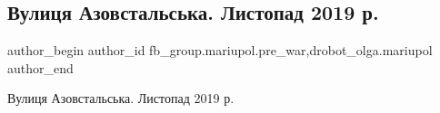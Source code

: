  
 
 
 
 

\subsection{Вулиця Азовстальська. Листопад 2019 р.}
\label{sec:27_02_2023.fb.fb_group.mariupol.pre_war.2.vulitsya_azovstalska}
 
\ifcmt
 author_begin
   author_id fb_group.mariupol.pre_war,drobot_olga.mariupol
 author_end
\fi

Вулиця Азовстальська. Листопад 2019 р.

